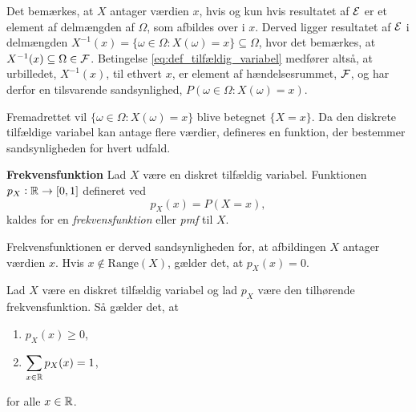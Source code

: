 Det bemærkes, at $X$ antager værdien $x$, hvis og kun hvis resultatet af $\mathcal{E}$ er et element af delmængden af $\Omega$, som afbildes over i $x$. Derved ligger resultatet af $\mathcal{E}$ i delmængden $X^{-1}(x) = \{\omega\in \Omega: X(\omega)=x\} \subseteq \Omega$, hvor det bemærkes, at  $X^{-1}(x)\subseteq \Omega \in \mathcal{F}$.
Betingelse \eqref{eq:def_tilfældig_variabel} medfører altså, at urbilledet, $X^{-1}(x)$, til ethvert $x$, er element af hændelsesrummet, $\mathcal{F}$, og har derfor en tilsvarende sandsynlighed, $P(\omega\in \Omega: X(\omega)=x)$.

Fremadrettet vil $\{\omega\in \Omega: X(\omega)=x\}$ blive betegnet $\{X=x\}$. Da den diskrete tilfældige variabel kan antage flere værdier, defineres en funktion, der bestemmer sandsynligheden for hvert udfald.

\begin{minipage}\textwidth
\begin{defn}\label{def:Frekvensfunktionen}\textbf{Frekvensfunktion} %
\newline
    Lad $X$ være en diskret tilfældig variabel. %
    Funktionen $p_X:\mathbb{R}\to [0,1]$ defineret ved
%    
    $$ p_X(x) = P(X = x),$$
%    
    kaldes for en \textit{frekvensfunktion} eller \textit{pmf} til $X$.
\end{defn}
\end{minipage}

Frekvensfunktionen er derved sandsynligheden for, at afbildingen $X$ antager værdien $x$.
Hvis $x\not\in \text{Range}(X)$, gælder det, at $p_X(x) = 0$. 


\begin{pro}\label{prop:frekvensfunktion}\textbf{}
\newline
    Lad $X$ være en diskret tilfældig variabel og lad $p_X$ være den tilhørende frekvensfunktion. Så gælder det, at
    \begin{enumerate}
        \item $\displaystyle p_X(x)\geq 0$,
        \item $\displaystyle \sum_{x\in \mathbb{R}} p_X(x)=1$,
    \end{enumerate}
    for alle $x\in \mathbb{R}$.
\end{pro}


